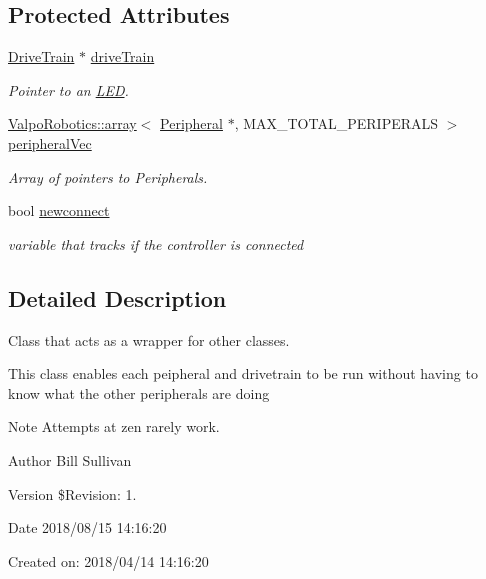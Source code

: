 \subsection*{Protected Attributes}
\begin{DoxyCompactItemize}
\item 
\mbox{\hyperlink{class_drive_train}{Drive\+Train}} $\ast$ \mbox{\hyperlink{class_robot_a4b499841182a38720a26a493fa98363a}{drive\+Train}}
\begin{DoxyCompactList}\small\item\em Pointer to an \mbox{\hyperlink{class_l_e_d}{L\+ED}}. \end{DoxyCompactList}\item 
\mbox{\hyperlink{class_valpo_robotics_1_1array}{Valpo\+Robotics\+::array}}$<$ \mbox{\hyperlink{class_peripheral}{Peripheral}} $\ast$, M\+A\+X\+\_\+\+T\+O\+T\+A\+L\+\_\+\+P\+E\+R\+I\+P\+E\+R\+A\+LS $>$ \mbox{\hyperlink{class_robot_a8db438771a3e7dc9d2cf5dd2e1d25f74}{peripheral\+Vec}}
\begin{DoxyCompactList}\small\item\em Array of pointers to Peripherals. \end{DoxyCompactList}\item 
\mbox{\label{class_robot_a19c7a18705cf4bc4359f5ba12c3541d8}} 
bool \mbox{\hyperlink{class_robot_a19c7a18705cf4bc4359f5ba12c3541d8}{newconnect}}
\begin{DoxyCompactList}\small\item\em variable that tracks if the controller is connected \end{DoxyCompactList}\end{DoxyCompactItemize}


\subsection{Detailed Description}
Class that acts as a wrapper for other classes. 

This class enables each peipheral and drivetrain to be run without having to know what the other peripherals are doing

\begin{DoxyNote}{Note}
Attempts at zen rarely work.
\end{DoxyNote}
\begin{DoxyAuthor}{Author}
Bill Sullivan
\end{DoxyAuthor}
\begin{DoxyVersion}{Version}
\$\+Revision\+: 1.
\end{DoxyVersion}
\begin{DoxyDate}{Date}
2018/08/15 14\+:16\+:20
\end{DoxyDate}
Created on\+: 2018/04/14 14\+:16\+:20

